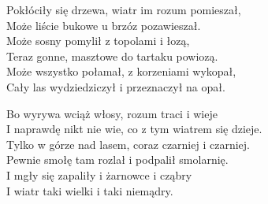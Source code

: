 \begin{text}
Pokłóciły się drzewa, wiatr im rozum pomieszał,\\
Może liście bukowe u brzóz pozawieszał.\\
Może sosny pomylił z topolami i łozą,\\
Teraz gonne, masztowe do tartaku powiozą.\\
Może wszystko połamał, z korzeniami wykopał,\\
Cały las wydziedziczył i przeznaczył na opał.

Bo wyrywa wciąż włosy, rozum traci i wieje\\
I naprawdę nikt nie wie, co z tym wiatrem się dzieje.\\
Tylko w górze nad lasem, coraz czarniej i czarniej.\\
Pewnie smołę tam rozlał i podpalił smolarnię.\\
I mgły się zapaliły i żarnowce i cząbry\\
I wiatr taki wielki i taki niemądry.
\end{text}